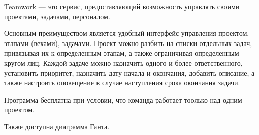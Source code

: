 
Teamwork --- это сервис, предоставляющий возможность управлять своими проектами, задачами, персоналом.

Основным преимуществом является удобный интерфейс управления проектом, этапами (вехами), задачами. 
Проект можно разбить на списки отдельных задач, привязывая их к определенным этапам, а также ограничивая определенным кругом лиц. 
Каждой задаче можно назначить одного и более ответственного, установить приоритет, назначить дату начала и окончания, добавить описание, а также настроить оповещение в случае наступления срока окончания задачи.

Программа бесплатна при условии, что команда работает тоолько над одним проектом.

Также доступна диаграмма Ганта.